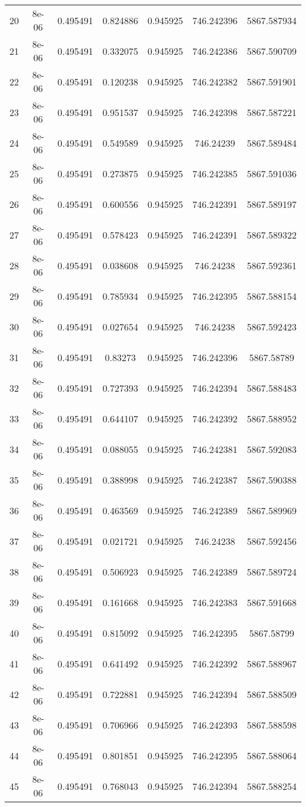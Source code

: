 \begin{table}
\begin{tabular*}{\linewidth}{c|c|c|c|c|c|c}
20 & 8e-06 & 0.495491 & 0.824886 & 0.945925 & 746.242396 & 5867.587934\\
21 & 8e-06 & 0.495491 & 0.332075 & 0.945925 & 746.242386 & 5867.590709\\
22 & 8e-06 & 0.495491 & 0.120238 & 0.945925 & 746.242382 & 5867.591901\\
23 & 8e-06 & 0.495491 & 0.951537 & 0.945925 & 746.242398 & 5867.587221\\
24 & 8e-06 & 0.495491 & 0.549589 & 0.945925 & 746.24239 & 5867.589484\\
25 & 8e-06 & 0.495491 & 0.273875 & 0.945925 & 746.242385 & 5867.591036\\
26 & 8e-06 & 0.495491 & 0.600556 & 0.945925 & 746.242391 & 5867.589197\\
27 & 8e-06 & 0.495491 & 0.578423 & 0.945925 & 746.242391 & 5867.589322\\
28 & 8e-06 & 0.495491 & 0.038608 & 0.945925 & 746.24238 & 5867.592361\\
29 & 8e-06 & 0.495491 & 0.785934 & 0.945925 & 746.242395 & 5867.588154\\
30 & 8e-06 & 0.495491 & 0.027654 & 0.945925 & 746.24238 & 5867.592423\\
31 & 8e-06 & 0.495491 & 0.83273 & 0.945925 & 746.242396 & 5867.58789\\
32 & 8e-06 & 0.495491 & 0.727393 & 0.945925 & 746.242394 & 5867.588483\\
33 & 8e-06 & 0.495491 & 0.644107 & 0.945925 & 746.242392 & 5867.588952\\
34 & 8e-06 & 0.495491 & 0.088055 & 0.945925 & 746.242381 & 5867.592083\\
35 & 8e-06 & 0.495491 & 0.388998 & 0.945925 & 746.242387 & 5867.590388\\
36 & 8e-06 & 0.495491 & 0.463569 & 0.945925 & 746.242389 & 5867.589969\\
37 & 8e-06 & 0.495491 & 0.021721 & 0.945925 & 746.24238 & 5867.592456\\
38 & 8e-06 & 0.495491 & 0.506923 & 0.945925 & 746.242389 & 5867.589724\\
39 & 8e-06 & 0.495491 & 0.161668 & 0.945925 & 746.242383 & 5867.591668\\
40 & 8e-06 & 0.495491 & 0.815092 & 0.945925 & 746.242395 & 5867.58799\\
41 & 8e-06 & 0.495491 & 0.641492 & 0.945925 & 746.242392 & 5867.588967\\
42 & 8e-06 & 0.495491 & 0.722881 & 0.945925 & 746.242394 & 5867.588509\\
43 & 8e-06 & 0.495491 & 0.706966 & 0.945925 & 746.242393 & 5867.588598\\
44 & 8e-06 & 0.495491 & 0.801851 & 0.945925 & 746.242395 & 5867.588064\\
45 & 8e-06 & 0.495491 & 0.768043 & 0.945925 & 746.242394 & 5867.588254\\
\end{tabular*}
\end{table}
